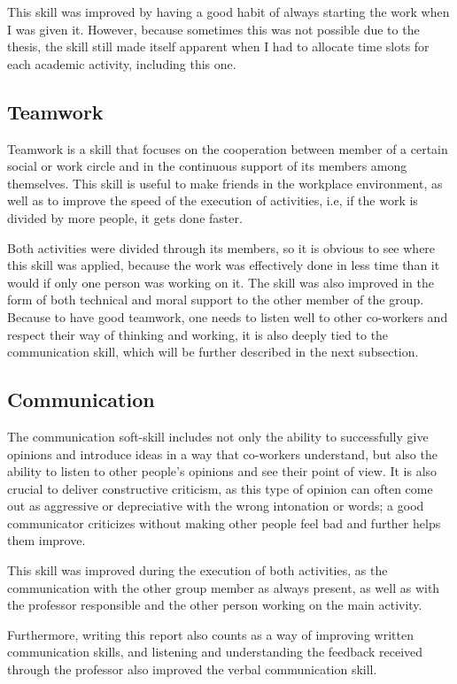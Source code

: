 \documentclass[a4paper,12pt,journal,twoside,compsoc]{PPIEEEtran}
\begin{document}
This skill was improved by having a good habit of always starting the work when I was given it. However, because sometimes this was not possible due to the thesis, the skill still made itself apparent when I had to allocate time slots for each academic activity, including this one. 

\subsection{Teamwork}

Teamwork is a skill that focuses on the cooperation between member of a certain social or work circle and in the continuous support of its members among themselves. This skill is useful to make friends in the workplace environment, as well as to improve the speed of the execution of activities, i.e, if the work is divided by more people, it gets done faster.

Both activities were divided through its members, so it is obvious to see where this skill was applied, because the work was effectively done in less time than it would if only one person was working on it. 
The skill was also improved in the form of both technical and moral support to the other member of the group. Because to have good teamwork, one needs to listen well to other co-workers and respect their way of thinking and working, it is also deeply tied to the communication skill, which will be further described in the next subsection.


\subsection{Communication}

The communication soft-skill includes not only the ability to successfully give opinions and introduce ideas in a way that co-workers understand, but also the ability to listen to other people's opinions and see their point of view. It is also crucial to deliver constructive criticism, as this type of opinion can often come out as aggressive or depreciative with the wrong intonation or words; a good communicator criticizes without making other people feel bad and further helps them improve. 

This skill was improved during the execution of both activities, as the communication with the other group member as always present, as well as with the professor responsible and the other person working on the main activity.

Furthermore, writing this report also counts as a way of improving written communication skills, and listening and understanding the feedback received through the professor also improved the verbal communication skill.
\end{document}
